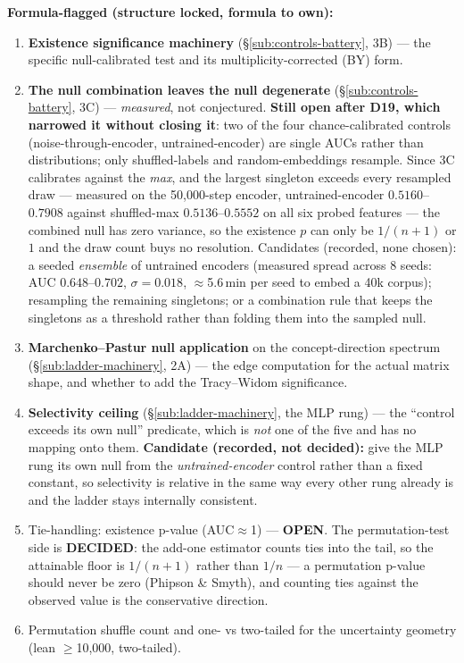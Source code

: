 \documentclass[11pt,a4paper]{article}
\begin{document}
\textbf{Formula-flagged (structure locked, formula to own):}
\begin{enumerate}[leftmargin=1.5em,itemsep=1pt,start=7]
\item \textbf{Existence significance machinery} (\S\ref{sub:controls-battery}, 3B) --- the specific null-calibrated test and its multiplicity-corrected (BY) form.
\item \textbf{The null combination leaves the null degenerate} (\S\ref{sub:controls-battery},
3C) --- \emph{measured}, not conjectured. \textbf{Still open after D19, which narrowed it
without closing it}: two of the four chance-calibrated controls (noise-through-encoder,
untrained-encoder) are single AUCs rather than distributions; only shuffled-labels and
random-embeddings resample. Since 3C calibrates against the \emph{max}, and the largest
singleton exceeds every resampled draw --- measured on the 50,000-step encoder, untrained-encoder
$0.5160$--$0.7908$ against shuffled-max $0.5136$--$0.5552$ on all six probed features --- the
combined null has zero variance, so the existence $p$ can only be $1/(n+1)$ or $1$ and the draw
count buys no resolution. Candidates
(recorded, none chosen): a seeded \emph{ensemble} of untrained encoders (measured spread across 8
seeds: AUC $0.648$--$0.702$, $\sigma = 0.018$, $\approx$5.6\,min per seed to embed a 40k corpus);
resampling the remaining singletons; or a combination rule that keeps the singletons as a
threshold rather than folding them into the sampled null.
\item \textbf{Marchenko--Pastur null application} on the concept-direction spectrum (\S\ref{sub:ladder-machinery}, 2A) --- the edge computation for the actual matrix shape, and whether to add the Tracy--Widom significance.
\item \textbf{Selectivity ceiling} (\S\ref{sub:ladder-machinery}, the MLP rung) --- the
``control exceeds its own null'' predicate, which is \emph{not} one of the five and has no
mapping onto them. \textbf{Candidate (recorded, not decided):} give the MLP rung its own null
from the \emph{untrained-encoder} control rather than a fixed constant, so selectivity is
relative in the same way every other rung already is and the ladder stays internally consistent.
\item Tie-handling: existence p-value (AUC$\approx$1) --- \textbf{OPEN}. The permutation-test
side is \textbf{DECIDED}: the add-one estimator counts ties into the tail, so the attainable
floor is $1/(n+1)$ rather than $1/n$ --- a permutation p-value should never be zero
(Phipson \& Smyth), and counting ties against the observed value is the conservative direction.
\item Permutation shuffle count and one- vs two-tailed for the uncertainty geometry (lean $\geq$10{,}000, two-tailed).
\end{enumerate}
\end{document}
